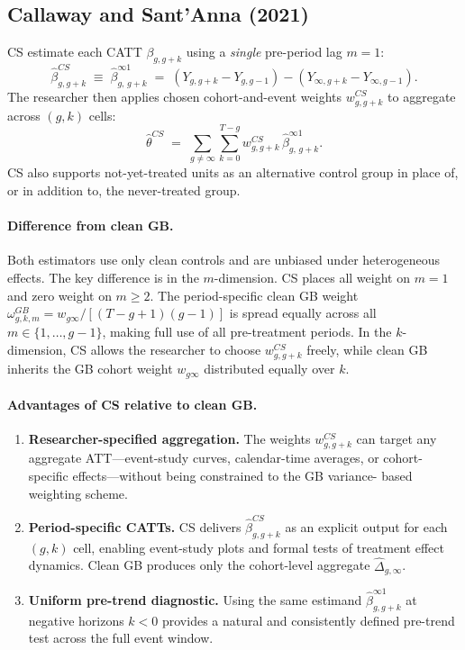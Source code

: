 \documentclass[12pt,letterpaper]{article}
\theoremstyle{remark}
\theoremstyle{definition}
\newcommand{\hbeta}{\hat{\beta}}
\newcommand{\hDelta}{\hat{\Delta}}
\begin{document}
\subsection{Callaway and Sant'Anna (2021)}
\label{sec:cs}

CS estimate each CATT $\beta_{g,g+k}$ using a \emph{single} pre-period lag
$m=1$:
\begin{equation}
  \hbeta^{CS}_{g,g+k}
  \;\equiv\;
  \hbeta^{\infty 1}_{g,\,g+k}
  \;=\;
  (Y_{g,g+k}-Y_{g,g-1})-(Y_{\infty,g+k}-Y_{\infty,g-1}).
  \label{eq:cs_catt}
\end{equation}
The researcher then applies chosen cohort-and-event weights $w^{CS}_{g,g+k}$
to aggregate across $(g,k)$ cells:
\begin{equation}
  \hat{\theta}^{CS}
  \;=\;
  \sum_{g\neq\infty}\sum_{k=0}^{T-g}
  w^{CS}_{g,g+k}\,\hbeta^{\infty 1}_{g,\,g+k}.
  \label{eq:cs_agg}
\end{equation}
CS also supports not-yet-treated units as an alternative control group in
place of, or in addition to, the never-treated group.

\paragraph{Difference from clean GB.}
Both estimators use only clean controls and are unbiased under heterogeneous
effects. The key difference is in the $m$-dimension. CS places all weight on
$m=1$ and zero weight on $m\geq2$. The period-specific clean GB weight
$\omega^{GB}_{g,k,m}=w_{g\infty}/[(T-g+1)(g-1)]$ is spread equally across
all $m\in\{1,\ldots,g-1\}$, making full use of all pre-treatment periods.
In the $k$-dimension, CS allows the researcher to choose $w^{CS}_{g,g+k}$
freely, while clean GB inherits the GB cohort weight $w_{g\infty}$ distributed
equally over $k$.

\paragraph{Advantages of CS relative to clean GB.}
\begin{enumerate}
  \item \textbf{Researcher-specified aggregation.} The weights $w^{CS}_{g,g+k}$
    can target any aggregate ATT---event-study curves, calendar-time averages,
    or cohort-specific effects---without being constrained to the GB variance-
    based weighting scheme.
  \item \textbf{Period-specific CATTs.} CS delivers $\hbeta^{CS}_{g,g+k}$ as
    an explicit output for each $(g,k)$ cell, enabling event-study plots and
    formal tests of treatment effect dynamics. Clean GB produces only the
    cohort-level aggregate $\hDelta_{g,\infty}$.
  \item \textbf{Uniform pre-trend diagnostic.} Using the same estimand
    $\hbeta^{\infty 1}_{g,g+k}$ at negative horizons $k<0$ provides a natural
    and consistently defined pre-trend test across the full event window.
\end{enumerate}
\end{document}
